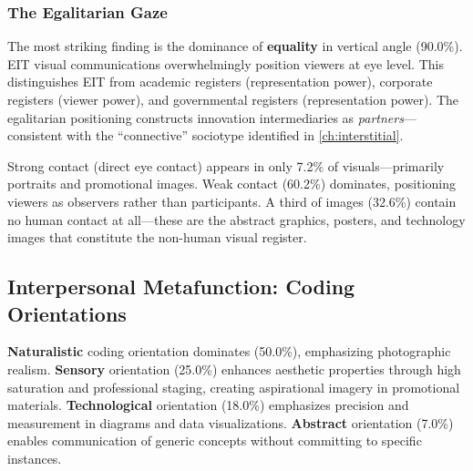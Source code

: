 \documentclass[../main.tex]{subfiles}
\begin{document}
\subsubsection{The Egalitarian Gaze}

The most striking finding is the dominance of \textbf{equality} in vertical angle (90.0\%). EIT visual communications overwhelmingly position viewers at eye level. This distinguishes EIT from academic registers (representation power), corporate registers (viewer power), and governmental registers (representation power). The egalitarian positioning constructs innovation intermediaries as \textit{partners}---consistent with the ``connective'' sociotype identified in \cref{ch:interstitial}.

Strong contact (direct eye contact) appears in only 7.2\% of visuals---primarily portraits and promotional images. Weak contact (60.2\%) dominates, positioning viewers as observers rather than participants. A third of images (32.6\%) contain no human contact at all---these are the abstract graphics, posters, and technology images that constitute the non-human visual register.


\subsection{Interpersonal Metafunction: Coding Orientations}


\textbf{Naturalistic} coding orientation dominates (50.0\%), emphasizing photographic realism. \textbf{Sensory} orientation (25.0\%) enhances aesthetic properties through high saturation and professional staging, creating aspirational imagery in promotional materials. \textbf{Technological} orientation (18.0\%) emphasizes precision and measurement in diagrams and data visualizations. \textbf{Abstract} orientation (7.0\%) enables communication of generic concepts without committing to specific instances.
\end{document}

